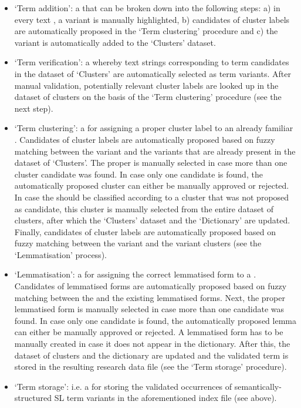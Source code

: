 \documentclass[output=paper]{langsci/langscibook.cls}
\begin{document}
\begin{itemize}
\item `Term addition': a  that can be broken down into the 
following steps: a) in every text , a  variant is manually highlighted, 
b) candidates of cluster labels are automatically proposed in the `Term clustering' 
procedure and c) the  variant is automatically added to the 
`Clusters' dataset.

\item `Term verification': a  whereby text strings corresponding 
to term candidates in the dataset of `Clusters' are automatically selected as term 
variants. After manual validation, potentially relevant cluster labels are looked 
up in the dataset of clusters on the basis of the `Term clustering' procedure (see 
the next step).

\item `Term clustering': a  for assigning a proper cluster 
label to an already familiar . Candidates of cluster labels are automatically 
proposed based on fuzzy matching between the  variant and the variants 
that are already present in the dataset of `Clusters'. The proper  
is manually selected in case more than one cluster candidate was found. In case 
only one candidate is found, the automatically proposed cluster can either be manually 
approved or rejected. In case the  should be classified according to 
a cluster that was not proposed as candidate, this cluster is manually selected 
from the entire dataset of clusters, after which the `Clusters' dataset and the 
`Dictionary' are updated. Finally, candidates of cluster labels are automatically 
proposed based on fuzzy matching between the  variant and the variant clusters 
(see the `Lemmatisation' process).

\item `Lemmatisation': a  for assigning the correct lemmatised 
form to a . Candidates of lemmatised forms are automatically proposed 
based on fuzzy matching between the  and the existing lemmatised forms. 
Next, the proper lemmatised form is manually selected in case more than one candidate 
was found. In case only one candidate is found, the automatically proposed lemma 
can either be manually approved or rejected. A lemmatised form has to be manually 
created in case it does not appear in the dictionary. After this, the dataset of 
clusters and the dictionary are updated and the validated term is stored in the 
resulting research data file (see the `Term storage' procedure).

\item `Term storage': i.e. a  for storing the validated occurrences 
of semantically-structured SL term variants in the aforementioned index file (see 
above).

\end{itemize}
\end{document}
